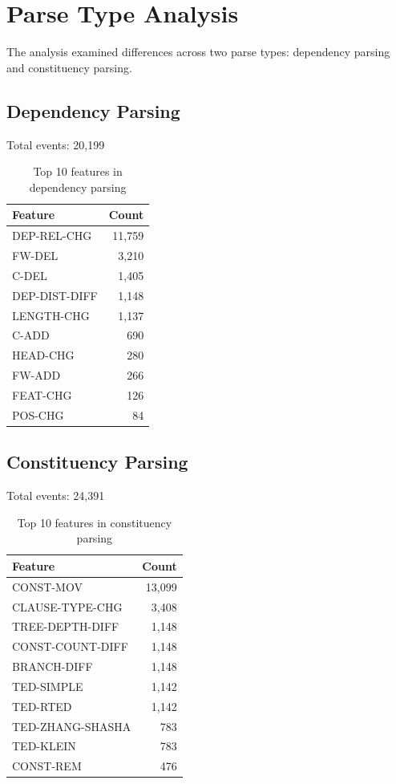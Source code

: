 \documentclass[11pt,a4paper]{article}
\begin{document}
\section{Parse Type Analysis}

The analysis examined differences across two parse types: dependency parsing and constituency parsing.

\subsection{Dependency Parsing}

Total events: 20,199

\begin{table}[h]
\centering
\begin{tabular}{lr}
\toprule
Feature & Count \\
\midrule
DEP-REL-CHG & 11,759 \\
FW-DEL & 3,210 \\
C-DEL & 1,405 \\
DEP-DIST-DIFF & 1,148 \\
LENGTH-CHG & 1,137 \\
C-ADD & 690 \\
HEAD-CHG & 280 \\
FW-ADD & 266 \\
FEAT-CHG & 126 \\
POS-CHG & 84 \\
\bottomrule
\end{tabular}
\caption{Top 10 features in dependency parsing}
\end{table}

\subsection{Constituency Parsing}

Total events: 24,391

\begin{table}[h]
\centering
\begin{tabular}{lr}
\toprule
Feature & Count \\
\midrule
CONST-MOV & 13,099 \\
CLAUSE-TYPE-CHG & 3,408 \\
TREE-DEPTH-DIFF & 1,148 \\
CONST-COUNT-DIFF & 1,148 \\
BRANCH-DIFF & 1,148 \\
TED-SIMPLE & 1,142 \\
TED-RTED & 1,142 \\
TED-ZHANG-SHASHA & 783 \\
TED-KLEIN & 783 \\
CONST-REM & 476 \\
\bottomrule
\end{tabular}
\caption{Top 10 features in constituency parsing}
\end{table}
\end{document}

